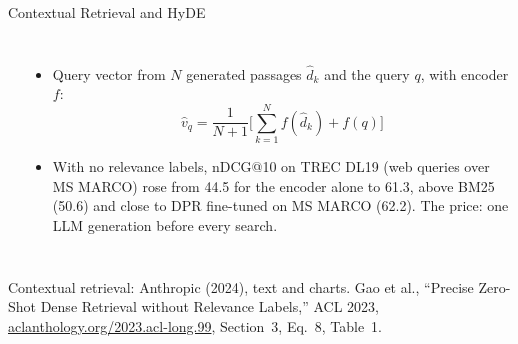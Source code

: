 \begin{frame}{Contextual Retrieval and HyDE}
\begin{columns}[T,onlytextwidth]
\begin{itemize}
      \end{itemize}
      \vspace{0.2em}
      {\centering
      \par}
      \begin{itemize}\scriptsize\itemsep0.3em
        \item[\textcolor{red}{$\blacktriangleright$}] Query vector from $N$ generated passages $\hat{d}_k$ and the query $q$, with encoder $f$:
          \[ \hat{v}_q = \frac{1}{N+1}\Big[\sum_{k=1}^{N} f(\hat{d}_k) + f(q)\Big] \]
        \item[\textcolor{red}{$\blacktriangleright$}] With no relevance labels, nDCG@10 on TREC DL19 (web queries over MS MARCO) rose from 44.5 for the encoder alone to 61.3, above BM25 (50.6) and close to DPR fine-tuned on MS MARCO (62.2). The price: one LLM generation before every search.
      \end{itemize}
  \end{columns}
  \vspace{0.1em}
  {\scriptsize Contextual retrieval: Anthropic (2024), text and charts. Gao et al., ``Precise Zero-Shot Dense Retrieval without Relevance Labels,'' ACL 2023, \href{https://aclanthology.org/2023.acl-long.99/}{aclanthology.org/2023.acl-long.99}, Section~3, Eq.~8, Table~1.}
\end{frame}

